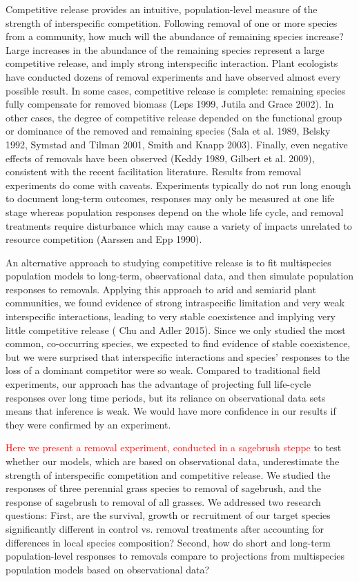 \documentclass[11pt]{article}
\newcommand{\new}{\textcolor{red}}
\begin{document}
\begin{doublespacing}
Competitive release provides an intuitive, population-level measure of the strength of interspecific competition. Following removal of one or more species from a community, how much will the abundance of remaining species increase? Large increases in the abundance of the remaining species represent a large competitive release, and imply strong interspecific interaction. Plant ecologists have conducted dozens of removal experiments and have observed almost every possible result. In some cases, competitive release is complete: remaining species fully compensate for removed biomass (Leps 1999, Jutila and Grace 2002). In other cases, the degree of competitive release depended on the functional group or dominance of the removed and remaining species (Sala et al. 1989, Belsky 1992, Symstad and Tilman 2001, Smith and Knapp 2003). Finally, even negative effects of removals have been observed (Keddy 1989, Gilbert et al. 2009), consistent with the recent facilitation literature. Results from removal experiments do come with caveats. Experiments typically do not run long enough to document long-term outcomes, responses may only be measured at one life stage whereas population responses depend on the whole life cycle, and removal treatments require disturbance which may cause a variety of impacts unrelated to resource competition (Aarssen and Epp 1990).

An alternative approach to studying competitive release is to fit multispecies population models to long-term, observational data, and then simulate population responses to removals. Applying this approach to arid and semiarid plant communities, we found evidence of strong intraspecific limitation and very weak interspecific interactions, leading to very stable coexistence and implying very little competitive release \citep{Adler:2010fu} ( Chu and Adler 2015). Since we only studied the most common, co-occurring species, we expected to find evidence of stable coexistence, but we were surprised that interspecific interactions and species' responses to the loss of a dominant competitor were so weak. Compared to traditional field experiments, our approach has the advantage of projecting full life-cycle responses over long time periods, but its reliance on observational data sets means that inference is weak. We would have more confidence in our results if they were confirmed by an experiment.

\new{Here we present a removal experiment, conducted in a sagebrush steppe} 
to test whether our models, which are based on observational data, underestimate the strength of interspecific competition and competitive release. We studied the responses of three perennial grass species to removal of sagebrush, and the response of sagebrush to removal of all grasses. We addressed two research questions: First, are the survival, growth or recruitment of our target species significantly different in control vs. removal treatments after accounting for differences in local species composition? Second, how do short and long-term population-level responses to removals compare to projections from multispecies population models based on observational data?


\end{doublespacing}
\end{document}
